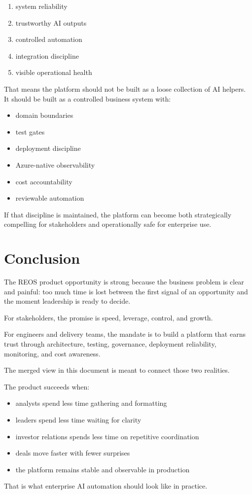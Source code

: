 \documentclass[11pt]{article}
\begin{document}
\begin{enumerate}
\item system reliability
\item trustworthy AI outputs
\item controlled automation
\item integration discipline
\item visible operational health
\end{enumerate}

That means the platform should not be built as a loose collection of AI helpers. It should be built as a controlled business system with:

\begin{itemize}
\item domain boundaries
\item test gates
\item deployment discipline
\item Azure-native observability
\item cost accountability
\item reviewable automation
\end{itemize}

If that discipline is maintained, the platform can become both strategically compelling for stakeholders and operationally safe for enterprise use.

\section{Conclusion}

The REOS product opportunity is strong because the business problem is clear and painful: too much time is lost between the first signal of an opportunity and the moment leadership is ready to decide.

For stakeholders, the promise is speed, leverage, control, and growth.

For engineers and delivery teams, the mandate is to build a platform that earns trust through architecture, testing, governance, deployment reliability, monitoring, and cost awareness.

The merged view in this document is meant to connect those two realities.

The product succeeds when:

\begin{itemize}
\item analysts spend less time gathering and formatting
\item leaders spend less time waiting for clarity
\item investor relations spends less time on repetitive coordination
\item deals move faster with fewer surprises
\item the platform remains stable and observable in production
\end{itemize}

That is what enterprise AI automation should look like in practice.
\end{document}
